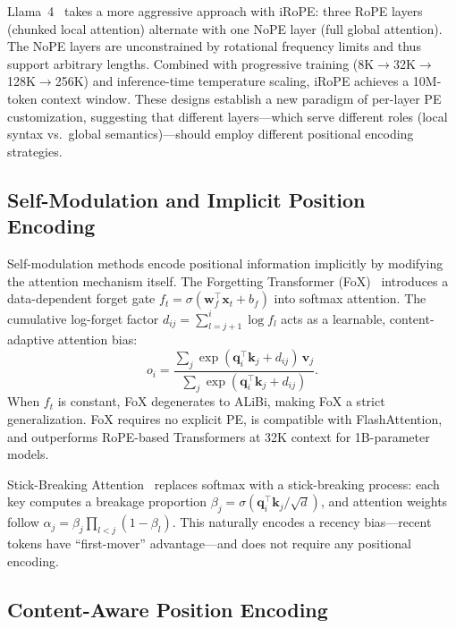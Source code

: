 Llama~4~\cite{llama4_2025} takes a more aggressive approach with iRoPE: three RoPE layers (chunked local attention) alternate with one NoPE layer (full global attention). The NoPE layers are unconstrained by rotational frequency limits and thus support arbitrary lengths. Combined with progressive training (8K$\to$32K$\to$128K$\to$256K) and inference-time temperature scaling, iRoPE achieves a 10M-token context window. These designs establish a new paradigm of per-layer PE customization, suggesting that different layers---which serve different roles (local syntax vs.\ global semantics)---should employ different positional encoding strategies.

\subsection{Self-Modulation and Implicit Position Encoding}
\label{subsec:self_modulation}

Self-modulation methods encode positional information implicitly by modifying the attention mechanism itself. The Forgetting Transformer (FoX)~\cite{lin2025forgetting} introduces a data-dependent forget gate $f_t = \sigma(\mathbf{w}_f^\top \mathbf{x}_t + b_f)$ into softmax attention. The cumulative log-forget factor $d_{ij} = \sum_{l=j+1}^{i} \log f_l$ acts as a learnable, content-adaptive attention bias:
\begin{equation}
  o_i = \frac{\sum_j \exp(\mathbf{q}_i^\top \mathbf{k}_j + d_{ij})\,\mathbf{v}_j}{\sum_j \exp(\mathbf{q}_i^\top \mathbf{k}_j + d_{ij})}.
  \label{eq:fox}
\end{equation}
When $f_t$ is constant, FoX degenerates to ALiBi, making FoX a strict generalization. FoX requires no explicit PE, is compatible with FlashAttention, and outperforms RoPE-based Transformers at 32K context for 1B-parameter models.

Stick-Breaking Attention~\cite{tan2024stick} replaces softmax with a stick-breaking process: each key computes a breakage proportion $\beta_j = \sigma(\mathbf{q}_i^\top \mathbf{k}_j / \sqrt{d})$, and attention weights follow $\alpha_j = \beta_j \prod_{l<j}(1-\beta_l)$. This naturally encodes a recency bias---recent tokens have ``first-mover'' advantage---and does not require any positional encoding.

\subsection{Content-Aware Position Encoding}
\label{subsec:content_aware_pe}

